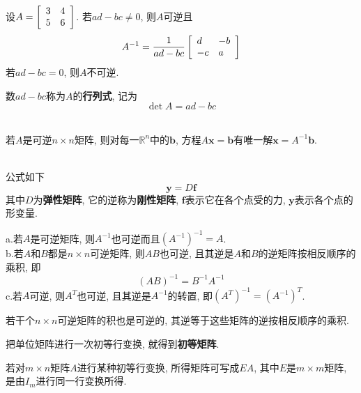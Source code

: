 \begin{TheoremOne}
设$A=\left[\begin{array}{r r}3 & 4\\5 & 6\end{array}\right]$. 若$ad-bc\neq 0$, 则$A$可逆且
\[A^{-1}=\frac{1}{ad-bc}\left[\begin{array}{l l}d & -b\\-c & a\end{array}\right]\]
若$ad-bc=0$, 则$A$不可逆.
\end{TheoremOne}\vspace{4ex}

数$ad-bc$称为$A$的\textbf{行列式}, 记为
\[\det A=ad-bc\]\\

\begin{TheoremOne}
若$A$是可逆$n\times n$矩阵, 则对每一$\mathbb{R}^n$中的$\bm{b}$, 方程$A\bm{x}=\bm{b}$有唯一解$\bm{x}=A^{-1}\bm{b}$.
\end{TheoremOne}\vspace{4ex}

\begin{law}[胡克定律]\ \\
公式如下
\[\bm{y}=D\bm{f}\]
其中$D$为\textbf{弹性矩阵}, 它的逆称为\textbf{刚性矩阵}, $\bm{f}$表示它在各个点受的力, $\bm{y}$表示各个点的形变量.
\end{law}\vspace{4ex}

\begin{TheoremTwo}
a.若$A$是可逆矩阵, 则$A^{-1}$也可逆而且$(A^{-1})^{-1}=A$.\\
b.若$A$和$B$都是$n\times n$可逆矩阵, 则$AB$也可逆, 且其逆是$A$和$B$的逆矩阵按相反顺序的乘积, 即
\[(AB)^{-1}=B^{-1}A^{-1}\]
c.若$A$可逆, 则$A^T$也可逆, 且其逆是$A^{-1}$的转置, 即$(A^T)^{-1}=(A^{-1})^T$.
\end{TheoremTwo}\vspace{4ex}

\begin{law}
若干个$n\times n$可逆矩阵的积也是可逆的, 其逆等于这些矩阵的逆按相反顺序的乘积.
\end{law}\vspace{4ex}

把单位矩阵进行一次初等行变换, 就得到\textbf{初等矩阵}.\\[2ex]

\begin{law}
若对$m\times n$矩阵$A$进行某种初等行变换, 所得矩阵可写成$EA$, 其中$E$是$m\times m$矩阵, 是由$I_m$进行同一行变换所得.
\end{law}\vspace{4ex}

